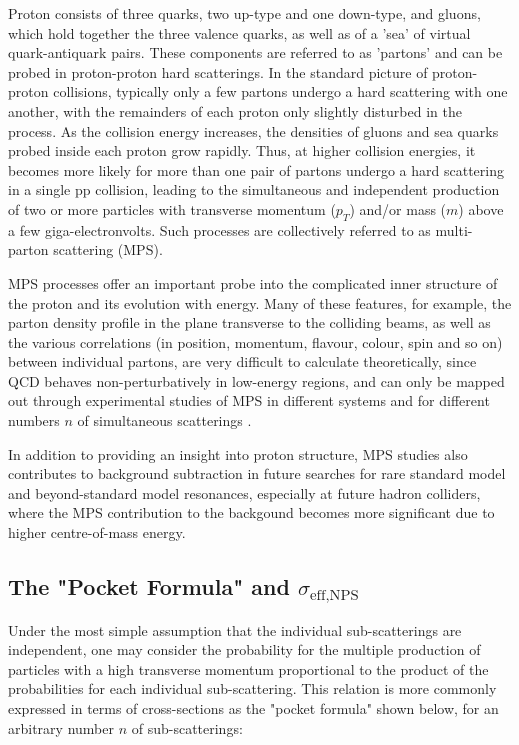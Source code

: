 \documentclass[10pt,twocolumn]{article}
\begin{document}
Proton consists of three quarks, two up-type and one down-type, and gluons, which hold together the three valence quarks, as well as of a 'sea' of virtual quark-antiquark pairs. These components are referred to as 'partons' and can be probed in proton-proton hard scatterings. In the standard picture of proton-proton collisions, typically only a few partons undergo a hard scattering with one another, with the remainders of each proton only slightly disturbed in the process. As the collision energy increases, the densities of gluons and sea quarks probed inside each proton grow rapidly. Thus, at higher collision energies, it becomes more likely for more than one pair of partons undergo a hard scattering in a single pp collision, leading to the simultaneous and independent production of two or more particles with transverse momentum ($p_T$) and/or mass ($m$) above a few giga-electronvolts. Such processes are collectively referred to as multi-parton scattering (MPS).

MPS processes offer an important probe into the complicated inner structure of the proton and its evolution with energy.\cite{DIEHL_MPI}\cite{BLOK_MPS} Many of these features, for example, the parton density profile in the plane transverse to the colliding beams, as well as the various correlations (in position, momentum, flavour, colour, spin and so on) between individual partons, are very difficult to calculate theoretically, since QCD behaves non-perturbatively in low-energy regions, and can only be mapped out through experimental studies of MPS in different systems and for different numbers $n$ of simultaneous scatterings \cite{MPI_LHC}.

In addition to providing an insight into proton structure, MPS studies also contributes to background subtraction in future searches for rare standard model and beyond-standard model resonances, especially at future hadron colliders, where the MPS contribution to the backgound becomes more significant due to higher centre-of-mass energy.\cite{DdE_TPS}\cite{YJZ_TRI_JPSI}

\subsection{The "Pocket Formula" and \texorpdfstring{$\sigma_{\text{eff,NPS}}$}{TPS Effective Cross-Section}}

Under the most simple assumption that the individual sub-scatterings are independent, one may consider the probability for the multiple production of particles with a high transverse momentum proportional to the product of the probabilities for each individual sub-scattering. This relation is more commonly expressed in terms of cross-sections as the "pocket formula" shown below, for an arbitrary number $n$ of sub-scatterings:
\end{document}
